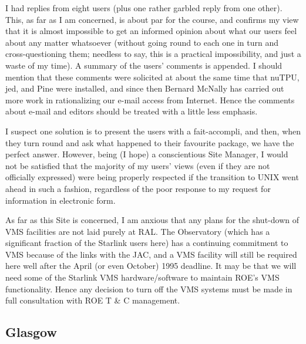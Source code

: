 I had replies from eight users (plus one rather garbled reply from one other).
This, as far as I am concerned, is about par for the course, and confirms my 
view that it is almost impossible to get an informed opinion about what our 
users feel about any matter whatsoever (without going round to each one in 
turn and cross-questioning them; needless to say, this is a practical 
impossibility, and just a waste of my time). 
A summary of the users' comments is appended.
I should mention that these comments were solicited at about the same time
that nuTPU, jed, and Pine were installed, and since then Bernard McNally has
carried out more work in rationalizing our e-mail access from Internet.
Hence the comments about e-mail and editors should be treated with a little
less emphasis.

I suspect one solution is to present the users with a fait-accompli, and
then, when they turn round and ask what happened to their favourite package,
we have the perfect answer.
However, being (I hope) a conscientious Site Manager, I would not be 
satisfied that the majority of my users' views (even if they are not 
officially expressed) were being properly respected if the transition to 
UNIX went ahead in such a fashion, regardless of the poor response to my 
request for information in electronic form.

As far as this Site is concerned, I am anxious that any plans for the shut-down
of VMS facilities are not laid purely at RAL. 
The Observatory (which has a significant fraction of the Starlink users here) 
has a continuing commitment to VMS because of the links with the JAC, and a 
VMS facility will still be required here well after the April (or even 
October) 1995 deadline.
It may be that we will need some of the Starlink VMS hardware/software to 
maintain ROE's VMS functionality.
Hence any decision to turn off the VMS systems must be made in full 
consultation with ROE T \& C management.


\newpage
\subsection{Glasgow}

\renewcommand{\starsitename}{Glasgow}
\renewcommand{\starnodename}{uk.ac.gla.astro}

\renewcommand{\starunixdate}{1993 September 1}
\renewcommand{\starupdate}{1993 October 26}

\renewcommand{\starsitetelephone}{041 339 8855 Ext. 4268}
\renewcommand{\starsitefax}{041 334 9029}

